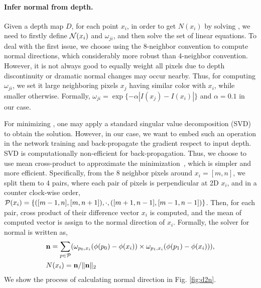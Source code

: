 \paragraph{Infer normal from depth.} 
\label{chap:d2n}
Given a depth map $D$, for each point $x_i$, in order to get $N(x_i)$ by solving , we need to firstly define ${\mathcal N}(x_i)$ and $\omega_{ji}$, and then solve the set of linear equations. To deal with the first issue, we choose using the 8-neighbor convention to compute normal directions, which considerably more robust than 4-neighbor convention. 
However, it is not always good to equally weight all pixels due to depth discontinuity or dramatic normal changes may occur nearby. Thus, for computing $\omega_{ji}$, we set it large neighboring pixels $x_j$ having similar color with $x_i$, while smaller otherwise. Formally, $\omega_{ji} = \exp\{-\alpha|I(x_j) - I(x_i)|\}$ and $\alpha = 0.1$ in our case. 

For minimizing , one may apply a standard singular value decomposition (SVD) to obtain the solution. However, in our case, we want to embed such an operation in the network training and back-propagate the gradient respect to input depth. SVD is computationally non-efficient for back-propagation. Thus, we choose to use mean cross-product to approximate the minimization~\cite{jia2006using}, which is simpler and more efficient. 
Specifically, from the 8 neighbor pixels around $x_i = [m, n]$, we split them to 4 pairs, where each pair of pixels is perpendicular at 2D \wrt $x_i$, and in a counter clock-wise order, \ie ${\mathcal P}(x_i) = \{([m-1, n], [m, n+1]), \cdot, ([m+1, n-1], [m-1, n-1])\}$. 
Then, for each pair, cross product of their difference vector \wrt $x_i$ is computed, and the mean of computed vector is assign to the normal direction of $x_i$. Formally, the solver for normal is written as, 
\begin{align}
\label{eq:cross}
&{\mathbf n} = \sum_{p\in{\mathcal P}}(\omega_{p_{0}, x_i}(\phi(p_{0}) - \phi(x_i)) \times \omega_{p_{1}, x_i}(\phi(p_{1}) - \phi(x_i))), \nonumber \\
&N(x_i) = {\mathbf n} / \|{\mathbf n}\|_2
\end{align}
We show the process of calculating normal direction in Fig. \ref{fig:d2n}. 

